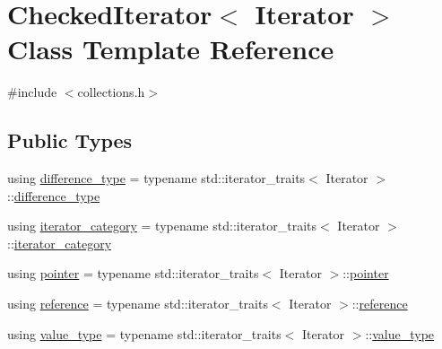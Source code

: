 \hypertarget{classstanfordcpplib_1_1collections_1_1CheckedIterator}{}\section{Checked\+Iterator$<$ Iterator $>$ Class Template Reference}
\label{classstanfordcpplib_1_1collections_1_1CheckedIterator}


{\ttfamily \#include $<$collections.\+h$>$}

\subsection*{Public Types}
\begin{DoxyCompactItemize}
\item 
using \mbox{\hyperlink{classstanfordcpplib_1_1collections_1_1CheckedIterator_ad050e8e82b0962bb9ebd0e7c23b436ac}{difference\+\_\+type}} = typename std\+::iterator\+\_\+traits$<$ Iterator $>$\+::\mbox{\hyperlink{classstanfordcpplib_1_1collections_1_1CheckedIterator_ad050e8e82b0962bb9ebd0e7c23b436ac}{difference\+\_\+type}}
\item 
using \mbox{\hyperlink{classstanfordcpplib_1_1collections_1_1CheckedIterator_ae6c7f7fefb373dec05bf6640b3abb38d}{iterator\+\_\+category}} = typename std\+::iterator\+\_\+traits$<$ Iterator $>$\+::\mbox{\hyperlink{classstanfordcpplib_1_1collections_1_1CheckedIterator_ae6c7f7fefb373dec05bf6640b3abb38d}{iterator\+\_\+category}}
\item 
using \mbox{\hyperlink{classstanfordcpplib_1_1collections_1_1CheckedIterator_aec43e3dd6c5819f52268692c4f174d89}{pointer}} = typename std\+::iterator\+\_\+traits$<$ Iterator $>$\+::\mbox{\hyperlink{classstanfordcpplib_1_1collections_1_1CheckedIterator_aec43e3dd6c5819f52268692c4f174d89}{pointer}}
\item 
using \mbox{\hyperlink{classstanfordcpplib_1_1collections_1_1CheckedIterator_a57d818f6bd24dee2a8803cb3be635373}{reference}} = typename std\+::iterator\+\_\+traits$<$ Iterator $>$\+::\mbox{\hyperlink{classstanfordcpplib_1_1collections_1_1CheckedIterator_a57d818f6bd24dee2a8803cb3be635373}{reference}}
\item 
using \mbox{\hyperlink{classstanfordcpplib_1_1collections_1_1CheckedIterator_ae7f303a443fbf651b13f8289d05ef498}{value\+\_\+type}} = typename std\+::iterator\+\_\+traits$<$ Iterator $>$\+::\mbox{\hyperlink{classstanfordcpplib_1_1collections_1_1CheckedIterator_ae7f303a443fbf651b13f8289d05ef498}{value\+\_\+type}}
\end{DoxyCompactItemize}
